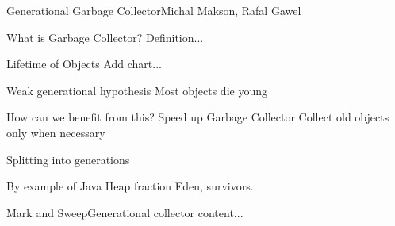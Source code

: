 \documentclass[english]{beamer}
\author{Michal Makson, Rafal Gawel}
\institute{AGH}
\begin{document}
	\begin{frame}{Generational Garbage Collector}{Michal Makson, Rafal Gawel}
	\end{frame}
	\begin{frame}{What is Garbage Collector?}
		Definition...
	\end{frame}

	\begin{frame}{Lifetime of Objects}
		Add chart...
	\end{frame}

	\begin{frame}{Weak generational hypothesis}
		Most objects die young
	\end{frame}

	\begin{frame}{How can we benefit from this?}
		Speed up Garbage Collector
		Collect old objects only when necessary
	\end{frame}

	\begin{frame}
		Splitting into generations
	\end{frame}
	
	\begin{frame}
		By example of Java Heap fraction Eden, survivors..
	\end{frame}

	\begin{frame}{Mark and Sweep}{Generational collector}
		content...
	\end{frame}
\end{document}
